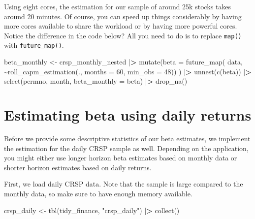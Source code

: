 \documentclass[
]{book}
\newenvironment{Shaded}{\begin{snugshade}}{\end{snugshade}}
\newcommand{\AttributeTok}[1]{\textcolor[rgb]{0.61,0.61,0.61}{#1}}
\newcommand{\DecValTok}[1]{\textcolor[rgb]{0.06,0.06,0.06}{#1}}
\newcommand{\ErrorTok}[1]{\textcolor[rgb]{0.14,0.14,0.14}{\textbf{#1}}}
\newcommand{\FunctionTok}[1]{\textcolor[rgb]{0,0,0}{#1}}
\newcommand{\NormalTok}[1]{#1}
\newcommand{\OtherTok}[1]{\textcolor[rgb]{0.37,0.37,0.37}{#1}}
\newcommand{\SpecialCharTok}[1]{\textcolor[rgb]{0,0,0}{#1}}
\newcommand{\StringTok}[1]{\textcolor[rgb]{0.5,0.5,0.5}{#1}}
\begin{document}
Using eight cores, the estimation for our sample of around 25k stocks takes around 20 minutes. Of course, you can speed up things considerably by having more cores available to share the workload or by having more powerful cores. Notice the difference in the code below? All you need to do is to replace \texttt{map()} with \texttt{future\_map()}.

\begin{Shaded}
\begin{Highlighting}[]
\NormalTok{beta\_monthly }\OtherTok{\textless{}{-}}\NormalTok{ crsp\_monthly\_nested }\SpecialCharTok{|}\ErrorTok{\textgreater{}}
  \FunctionTok{mutate}\NormalTok{(}\AttributeTok{beta =} \FunctionTok{future\_map}\NormalTok{(}
\NormalTok{    data, }\SpecialCharTok{\textasciitilde{}}\FunctionTok{roll\_capm\_estimation}\NormalTok{(., }\AttributeTok{months =} \DecValTok{60}\NormalTok{, }\AttributeTok{min\_obs =} \DecValTok{48}\NormalTok{))}
\NormalTok{    ) }\SpecialCharTok{|}\ErrorTok{\textgreater{}}
  \FunctionTok{unnest}\NormalTok{(}\FunctionTok{c}\NormalTok{(beta)) }\SpecialCharTok{|}\ErrorTok{\textgreater{}}
  \FunctionTok{select}\NormalTok{(permno, month, }\AttributeTok{beta\_monthly =}\NormalTok{ beta) }\SpecialCharTok{|}\ErrorTok{\textgreater{}}
  \FunctionTok{drop\_na}\NormalTok{()}
\end{Highlighting}
\end{Shaded}

\hypertarget{estimating-beta-using-daily-returns}{%
\section{Estimating beta using daily returns}\label{estimating-beta-using-daily-returns}}

Before we provide some descriptive statistics of our beta estimates, we implement the estimation for the daily CRSP sample as well.
Depending on the application, you might either use longer horizon beta estimates based on monthly data or shorter horizon estimates based on daily returns.

First, we load daily CRSP data.
Note that the sample is large compared to the monthly data, so make sure to have enough memory available.

\begin{Shaded}
\begin{Highlighting}[]
\NormalTok{crsp\_daily }\OtherTok{\textless{}{-}} \FunctionTok{tbl}\NormalTok{(tidy\_finance, }\StringTok{"crsp\_daily"}\NormalTok{) }\SpecialCharTok{|}\ErrorTok{\textgreater{}}
  \FunctionTok{collect}\NormalTok{()}
\end{Highlighting}
\end{Shaded}
\end{document}

